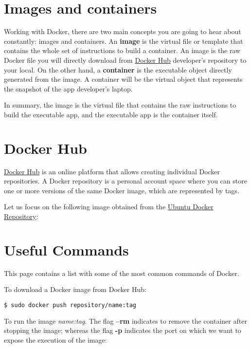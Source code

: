 \documentclass[]{book}
\begin{document}
\section{Images and containers}\label{images-and-containers}

Working with Docker, there are two main concepts you are going to hear
about constantly: images and containers. An \textbf{image} is the
virtual file or template that contains the whole set of instructions to
build a container. An image is the raw Docker file you will directly
download from \href{https://hub.docker.com/}{Docker Hub} developer's
repository to your local. On the other hand, a \textbf{container} is the
executable object directly generated from the image. A container will be
the virtual object that represents the snapshot of the app developer's
laptop.

In summary, the image is the virtual file that contains the raw
instructions to build the executable app, and the executable app is the
container itself.

\section{Docker Hub}\label{docker-hub}

\href{https://hub.docker.com/}{Docker Hub} is an online platform that
allows creating individual Docker repositories. A Docker repository is a
personal account space where you can store one or more versions of the
same Docker image, which are represented by tags.

Let us focus on the following image obtained from the
\href{https://hub.docker.com/_/ubuntu?tab=tags}{Ubuntu Docker
Repository}:

\section{Useful Commands}\label{useful-commands}

This page contains a list with some of the most common commands of
Docker.

To download a Docker image from Docker Hub:

\begin{verbatim}
$ sudo docker push repository/name:tag
\end{verbatim}

To run the image \emph{name:tag}. The flag \textbf{--rm} indicates to
remove the container after stopping the image; whereas the flag
\textbf{-p} indicates the port on which we want to expose the execution
of the image:
\end{document}

